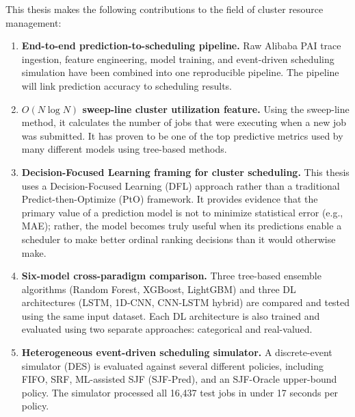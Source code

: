 This thesis makes the following contributions to the field of cluster resource management:
\begin{enumerate}
    \item \textbf{End-to-end prediction-to-scheduling pipeline.} Raw Alibaba PAI trace ingestion, feature engineering, model training, and event-driven scheduling simulation have been combined into one reproducible pipeline. The pipeline will link prediction accuracy to scheduling results.

    \item \textbf{$O(N \log N)$ sweep-line cluster utilization feature.} Using the sweep-line method, it calculates the number of jobs that were executing when a new job was submitted. It has proven to be one of the top predictive metrics used by many different models using tree-based methods.

    \item \textbf{Decision-Focused Learning framing for cluster scheduling.} This thesis uses a Decision-Focused Learning (DFL) approach rather than a traditional Predict-then-Optimize (PtO) framework. It provides evidence that the primary value of a prediction model is not to minimize statistical error (e.g., MAE); rather, the model becomes truly useful when its predictions enable a scheduler to make better ordinal ranking decisions than it would otherwise make.

    \item \textbf{Six-model cross-paradigm comparison.} Three tree-based ensemble algorithms (Random Forest, XGBoost, LightGBM) and three DL architectures (LSTM, 1D-CNN, CNN-LSTM hybrid) are compared and tested using the same input dataset. Each DL architecture is also trained and evaluated using two separate approaches: categorical and real-valued.

    \item \textbf{Heterogeneous event-driven scheduling simulator.} A discrete-event simulator (DES) is evaluated against several different policies, including FIFO, SRF, ML-assisted SJF (SJF-Pred), and an SJF-Oracle upper-bound policy. The simulator processed all 16,437 test jobs in under 17 seconds per policy.


\end{enumerate}
